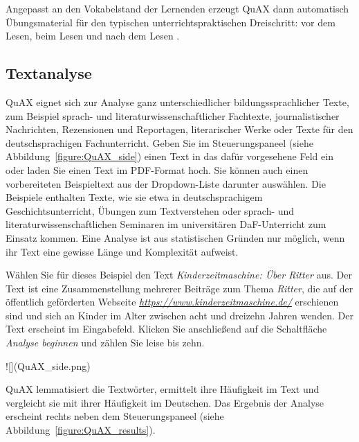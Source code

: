 \documentclass[11pt]{article}\usepackage[]{graphicx}\usepackage[]{color}
\begin{document}
Angepasst an den Vokabelstand der Lernenden erzeugt QuAX dann automatisch Übungsmaterial für den typischen unterrichtspraktischen Dreischritt: vor dem Lesen, beim Lesen und nach dem Lesen \parencite[20]{Watkins.2017}. 

\subsection{Textanalyse}

QuAX eignet sich zur Analyse ganz unterschiedlicher bildungssprachlicher Texte, zum Beispiel sprach- und literaturwissenschaftlicher Fachtexte, journalistischer Nachrichten, Rezensionen und Reportagen, literarischer Werke oder Texte für den deutschsprachigen Fachunterricht. Geben Sie im Steuerungspaneel (siehe Abbildung~\ref{figure:QuAX_side}) einen Text in das dafür vorgesehene Feld ein oder laden Sie einen Text im PDF-Format hoch. Sie können auch einen vorbereiteten Beispieltext aus der Dropdown-Liste darunter auswählen. Die Beispiele enthalten Texte, wie sie etwa in deutschsprachigem Geschichtsunterricht, Übungen zum Textverstehen oder sprach- und literaturwissenschaftlichen Seminaren im universitären DaF-Unterricht zum Einsatz kommen. Eine Analyse ist aus statistischen Gründen nur möglich, wenn ihr Text eine gewisse Länge und Komplexität aufweist. 

Wählen Sie für dieses Beispiel den Text \textit{Kinderzeitmaschine: Über Ritter} aus. Der Text ist eine Zusammenstellung mehrerer Beiträge zum Thema \textit{Ritter}, die auf der öffentlich geförderten Webseite \textit{\url{https://www.kinderzeitmaschine.de/}} erschienen sind und sich an Kinder im Alter zwischen acht und dreizehn Jahren wenden. Der Text erscheint im Eingabefeld. Klicken Sie anschließend auf die Schaltfläche \textit{Analyse beginnen} und zählen Sie leise bis zehn.

![](QuAX_side.png)

QuAX lemmatisiert die Textwörter, ermittelt ihre Häufigkeit im Text und vergleicht sie mit ihrer Häufigkeit im Deutschen. Das Ergebnis der Analyse erscheint rechts neben dem Steuerungspaneel (siehe Abbildung~\ref{figure:QuAX_results}). 
\end{document}
